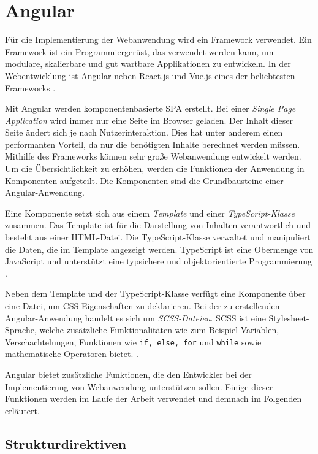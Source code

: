 \chapter{Angular}\label{Angular}

Für die Implementierung der Webanwendung wird ein Framework verwendet. Ein Framework ist ein Programmiergerüst, das verwendet werden kann, um modulare, skalierbare und gut wartbare Applikationen zu entwickeln. In der Webentwicklung ist Angular neben React.js und Vue.js eines der beliebtesten Frameworks \cite{stackoverflow2021}.  

Mit Angular werden komponentenbasierte \ac{SPA} erstellt. Bei einer \textit{Single Page Application} wird immer nur eine Seite im Browser geladen. Der Inhalt dieser Seite ändert sich je nach Nutzerinteraktion. Dies hat unter anderem einen performanten Vorteil, da nur die benötigten Inhalte berechnet werden müssen. 
Mithilfe des Frameworks können sehr große Webanwendung entwickelt werden. Um die Übersichtlichkeit zu erhöhen, werden die Funktionen der Anwendung in Komponenten aufgeteilt. Die Komponenten sind die Grundbausteine einer Angular-Anwendung. 

Eine Komponente setzt sich aus einem \textit{Template} und einer \textit{TypeScript-Klasse} zusammen. Das Template ist für die Darstellung von Inhalten verantwortlich und besteht aus einer HTML-Datei. Die TypeScript-Klasse verwaltet und manipuliert die Daten, die im Template angezeigt werden. TypeScript ist eine Obermenge von JavaScript und unterstützt eine typsichere und objektorientierte Programmierung \cite{TypeScript2021}. 

Neben dem Template und der TypeScript-Klasse verfügt eine Komponente über eine Datei, um CSS-Eigenschaften zu deklarieren. Bei der zu erstellenden Angular-Anwendung handelt es sich um \textit{SCSS-Dateien}. SCSS ist eine Stylesheet-Sprache, welche zusätzliche Funktionalitäten wie zum Beispiel Variablen, Verschachtelungen, Funktionen wie \texttt{if, else, for} und \texttt{while} sowie mathematische Operatoren bietet.   \cite{Sass2021}. 

Angular bietet zusätzliche Funktionen, die den Entwickler bei der Implementierung von Webanwendung unterstützen sollen. Einige dieser Funktionen werden im Laufe der Arbeit verwendet und demnach im Folgenden erläutert. 


\section{Strukturdirektiven} \label{sec:Strukturdirektive}

